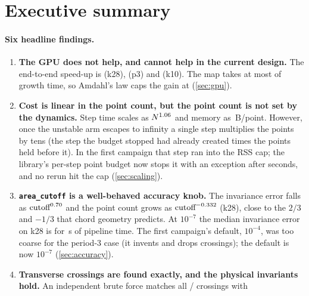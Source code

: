 \documentclass[11pt,a4paper]{article}
\newcommand{\code}[1]{\texttt{#1}}
\begin{document}
\tableofcontents
\clearpage
{}

\section{Executive summary}
\label{sec:summary}

\paragraph{Six headline findings.}
\begin{enumerate}[leftmargin=*]
\item \textbf{The GPU does not help, and cannot help in the current design.}
  The end-to-end speed-up is \NumGpuTotalSpeedupMedianKTwoEight{} (k28),
  \NumGpuTotalSpeedupMedianPThree{} (p3) and \NumGpuTotalSpeedupMedianKTen{}
  (k10). The map takes at most \NumMapFractionMax{} of growth time, so
  Amdahl's law caps the gain at \NumAmdahlBoundMax{}
  (\cref{sec:gpu}).
\item \textbf{Cost is linear in the point count, but the point count is not
  set by the dynamics.} Step time scales as $N^{1.06}$ and
  memory as \NumBytesPerPoint{}\,B/point. However, once the unstable arm
  escapes to infinity a single step multiplies the points by tens (the step
  the budget stopped had already created \NumScalingBudgetFactorMax{} times
  the points held before it). In the first campaign that step ran into the
  RSS cap; the library's per-step point budget now stops it with an
  exception after seconds, and no rerun hit the cap (\cref{sec:scaling}).
\item \textbf{\code{area\_cutoff} is a well-behaved accuracy knob.} The
  invariance error falls as $\text{cutoff}^{0.70}$ and the
  point count grows as $\text{cutoff}^{-0.332}$
  (k28), close to the $2/3$ and $-1/3$ that chord geometry predicts. At $10^{-7}$ the median invariance error on k28 is
  \NumInvPFiftyKTwoEightCutoffSeven{} for \NumTimeKTwoEightCutoffSeven\,s of
  pipeline time. The first campaign's default, $10^{-4}$, was too coarse for
  the period-3 case (it invents and drops crossings); the default is now
  $10^{-7}$ (\cref{sec:accuracy}).
\item \textbf{Transverse crossings are found exactly, and the physical
  invariants hold.} An independent brute force matches all
  \NumIsectMatchedTotal{}/\NumIsectBruteTotal{} crossings with

\end{enumerate}
\end{document}
